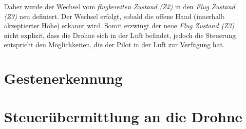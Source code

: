 Daher wurde der Wechsel vom \textit{flugbereiten Zustand (Z2)} in den \textit{Flug Zustand (Z3)} neu definiert. 
Der Wechsel erfolgt, sobald die offene Hand (innerhalb akzeptierter Höhe) erkannt wird.
Somit erzwingt der neue \textit{Flug Zustand (Z3)} nicht explizit, dass die Drohne sich in der Luft befindet, jedoch die Steuerung entspricht den Möglichkeiten, die der Pilot in der Luft zur Verfügung hat.


\section{Gestenerkennung}

\section{Steuerübermittlung an die Drohne}

